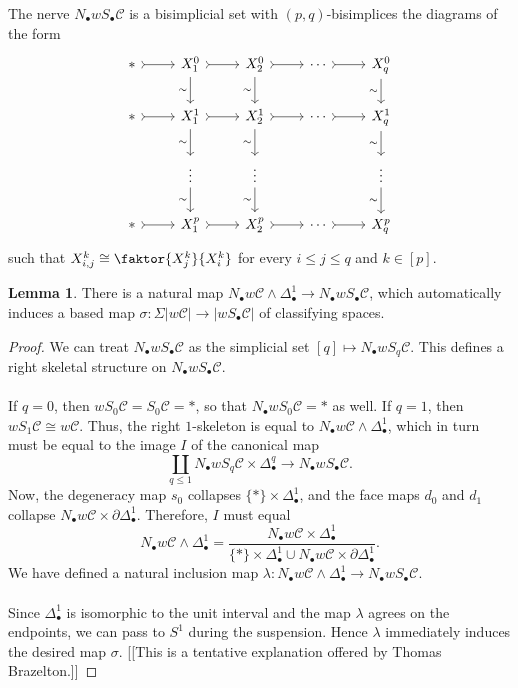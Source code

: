 \documentclass[10pt,letterpaper,cm]{nupset}
\theoremstyle{definition}
\theoremstyle{theorem}
\newtheorem{lemma}[theorem]{Lemma}
\theoremstyle{remark}
\newcommand{\1}{\mathbf{1}}
\renewcommand{\c}{\mathscr{C}}
\newcommand{\0}{\vec 0}
\begin{document}
The nerve $N_{\bullet}w S_{\bullet}\c$ is a bisimplicial set with $(p,q)$-bisimplices the diagrams of the form
\[
\begin{tikzcd}
\ast \arrow[r, tail] & X_1^0 \arrow[d, "\sim"'] \arrow[r, tail] & X_2^0 \arrow[r, tail] \arrow[d, "\sim"'] & \cdots \arrow[r, tail] & X_q^0 \arrow[d, "\sim"'] \\
\ast \arrow[r, tail] & X_1^1 \arrow[d, "\sim"'] \arrow[r, tail] & X_2^1 \arrow[r, tail] \arrow[d, "\sim"'] & \cdots \arrow[r, tail] & X_q^1 \arrow[d, "\sim"'] \\
 & \vdots \arrow[d, "\sim"'] & \vdots \arrow[d, "\sim"'] &  & \vdots \arrow[d, "\sim"'] \\
\ast \arrow[r, tail] & X_1^p \arrow[r, tail] & X_2^p \arrow[r, tail] & \cdots \arrow[r, tail] & X_q^p
\end{tikzcd}
\]
such that $X^k_{i,j} \cong \faktor{X_j^k}{X_i^k}$ for every $i\leq j\leq q$ and $k\in [p]$. 


\begin{lemma}
There is a natural map $N_{\bullet} w \c \land \Delta_{\bullet}^1 \to N_{\bullet} w S_{\bullet} \c$, which automatically induces a based map $\sigma : \Sigma |w \c|\to |w S_{\bullet} \c|$ of classifying spaces.
\end{lemma}
\begin{proof}
We can treat $N_{\bullet} w S_{\bullet} \c$ as the simplicial set $[q] \mapsto N_{\bullet} w S_q \c$. This defines a right skeletal structure on $N_{\bullet} w S_{\bullet} \c$. 
\\ \\ If $q = 0$, then $w S_0 \c = S_0 \c = \ast$, so that $N_{\bullet} w S_0\c = \ast$ as well. If $q= 1$, then
$w S_1 \c \cong w \c$. Thus, the right $1$-skeleton is equal to $N_{\bullet} w \c  \land \Delta_{\bullet}^1$, which in turn must be equal to the image $I$ of the canonical map $$\coprod_{q\leq 1} N_{\bullet} w S_q \c \times \Delta_{\bullet}^q \to N_{\bullet} w S_{\bullet} \c.$$ Now, the degeneracy map $s_0$ collapses $\{\ast\} \times \Delta_{\bullet}^1$, and the face maps $d_0$ and $d_1$ collapse $ N_{\bullet} w \c \times \partial{\Delta_{\bullet}^1}$. 
Therefore, $I$ must equal $$N_{\bullet} w \c  \land \Delta_{\bullet}^1  = \frac{N_{\bullet} w \c \times \Delta_{\bullet}^1}{\{\ast\} \times \Delta_{\bullet}^1 \cup N_{\bullet} w \c \times \partial{\Delta_{\bullet}^1}}.$$  We have defined a natural inclusion map $\lambda : N_{\bullet} w \c \land \Delta_{\bullet}^1 \to  N_{\bullet} w S_{\bullet} \c$.
\\  \\ Since $\Delta_{\bullet}^1$ is isomorphic to the unit interval and the map $\lambda$ agrees on the endpoints, we can pass to $S^1$ during the suspension. Hence $\lambda$ immediately induces the desired map $\sigma$. {[[This is a tentative explanation offered by Thomas Brazelton.]]}
\end{proof}
\end{document}
